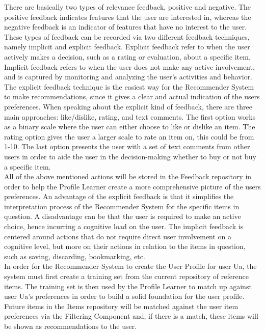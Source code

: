 There are basically two types of relevance feedback, positive and negative. The positive feedback indicates features that the user are interested in, whereas the negative feedback is an indicator of features that have no interest to the user. 
These types of feedback can be recorded via two different feedback techniques, namely implicit and explicit feedback. Explicit feedback refer to when the user actively makes a decision, such as a rating or evaluation, about a specific item. Implicit feedback refers to when the user does not make any active involvement, and is captured by monitoring and analyzing the user's activities and behavior.
The explicit feedback technique is the easiest way for the Recommender System to make recommendations, since it gives a clear and actual indication of the users preferences. When speaking about the explicit kind of feedback, there are three main approaches: like/dislike, rating, and text comments.
The first option works as a binary scale where the user can either choose to like or dislike an item.
The rating option gives the user a larger scale to rate an item on, this could be from 1-10.
The last option presents the user with a set of text comments from other users in order to aide the user in the decision-making whether to buy or not buy a specific item.\\

All of the above mentioned actions will be stored in the Feedback repository in order to help the Profile Learner create a more comprehensive picture of the users preferences. An advantage of the explicit feedback is that it simplifies the interpretation process of the Recommender System for the specific items in question. A disadvantage can be that the user is required to make an active choice, hence incurring a cognitive load on the user. The implicit feedback is centered around actions that do not require direct user involvement on a cognitive level, but more on their actions in relation to the items in question, such as saving, discarding, bookmarking, etc.\\

In order for the Recommender System to create the User Profile for user Ua, the system must first create a training set from the current repository of reference items. The training set is then used by the Profile Learner to match up against user Ua's preferences in order to build a solid foundation for the user profile. Future items in the Items repository will be matched against the user item preferences via the Filtering Component and, if there is a match, these items will be shown as recommendations to the user. \\

